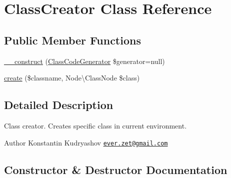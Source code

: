 \hypertarget{class_prophecy_1_1_doubler_1_1_generator_1_1_class_creator}{}\section{Class\+Creator Class Reference}
\label{class_prophecy_1_1_doubler_1_1_generator_1_1_class_creator}
\subsection*{Public Member Functions}
\begin{DoxyCompactItemize}
\item 
\mbox{\hyperlink{class_prophecy_1_1_doubler_1_1_generator_1_1_class_creator_a7487efef8f85be5720dfeaf0867fe65f}{\+\_\+\+\_\+construct}} (\mbox{\hyperlink{class_prophecy_1_1_doubler_1_1_generator_1_1_class_code_generator}{Class\+Code\+Generator}} \$generator=null)
\item 
\mbox{\hyperlink{class_prophecy_1_1_doubler_1_1_generator_1_1_class_creator_ad62d66c423b697477e5823c5c6a903c0}{create}} (\$classname, Node\textbackslash{}\+Class\+Node \$class)
\end{DoxyCompactItemize}


\subsection{Detailed Description}
Class creator. Creates specific class in current environment.

\begin{DoxyAuthor}{Author}
Konstantin Kudryashov \href{mailto:ever.zet@gmail.com}{\tt ever.\+zet@gmail.\+com} 
\end{DoxyAuthor}


\subsection{Constructor \& Destructor Documentation}
\mbox{\label{class_prophecy_1_1_doubler_1_1_generator_1_1_class_creator_a7487efef8f85be5720dfeaf0867fe65f}} 
